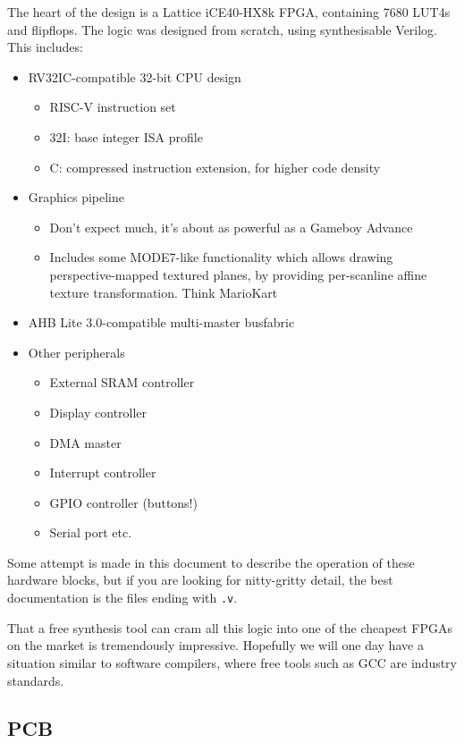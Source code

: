 \documentclass{article}
\begin{document}
The heart of the design is a Lattice iCE40-HX8k FPGA, containing 7680 LUT4s and flipflops. The logic was designed from scratch, using synthesisable Verilog. This includes:
\begin{itemize}
\item RV32IC-compatible 32-bit CPU design
	\begin{itemize}
	\item RISC-V instruction set
	\item 32I: base integer ISA profile
	\item C: compressed instruction extension, for higher code density
	\end{itemize}
\item Graphics pipeline
	\begin{itemize}
	\item Don't expect much, it's about as powerful as a Gameboy Advance
	\item Includes some MODE7-like functionality which allows drawing perspective-mapped textured planes, by providing per-scanline affine texture transformation. Think MarioKart
	\end{itemize}
\item AHB Lite 3.0-compatible multi-master busfabric
\item Other peripherals
	\begin{itemize}
	\item External SRAM controller
	\item Display controller
	\item DMA master
	\item Interrupt controller
	\item GPIO controller (buttons!)
	\item Serial port etc.
	\end{itemize}
\end{itemize}

Some attempt is made in this document to describe the operation of these hardware blocks, but if you are looking for nitty-gritty detail, the best documentation is the files ending with \texttt{.v}.

That a free synthesis tool can cram all this logic into one of the cheapest FPGAs on the market is tremendously impressive. Hopefully we will one day have a situation similar to software compilers, where free tools such as GCC are industry standards.

\subsection{PCB}
\end{document}
